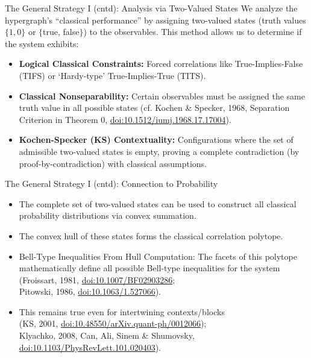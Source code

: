\documentclass{beamer}
\begin{document}
\begin{frame}[shrink]{The General Strategy I (cntd): Analysis via Two-Valued States}
\small
    We analyze the hypergraph's ``classical performance'' by assigning \alert{two-valued states} (truth values $\{1, 0\}$ or $\{$true, false$\}$) to the observables.
%
    This method allows us to determine if the system exhibits:
    \begin{itemize} [<+->] %
        \item \textbf{Logical Classical Constraints:} Forced correlations like True-Implies-False (TIFS) or `Hardy-type' True-Implies-True (TITS).
        \vspace{1em}
        \item \textbf{Classical Nonseparability:} Certain observables must be assigned the same truth value in all possible states (cf. Kochen \& Specker, 1968, Separation Criterion in Theorem 0, \href{https://doi.org/10.1512/iumj.1968.17.17004}{doi:10.1512/iumj.1968.17.17004}).
        \vspace{1em}
        \item \textbf{Kochen-Specker (KS) Contextuality:} Configurations where the set of admissible two-valued states is \alert{empty},
proving a complete contradiction (by proof-by-contradiction) with classical assumptions.
    \end{itemize}
\end{frame}


\begin{frame}{The General Strategy I (cntd): Connection to Probability}
    \begin{itemize}[<+->] %
        \item The complete set of two-valued states can be used to construct all classical probability distributions via \alert{convex summation}.
        \item The convex hull of these states forms the \alert{classical correlation polytope}.
        \item \alert{Bell-Type Inequalities From Hull Computation:} The facets of this polytope mathematically define all
possible  Bell-type inequalities
for the system\\
{\small (Froissart, 1981, \href{https://doi.org/10.1007/BF02903286}{doi:10.1007/BF02903286}; \\
Pitowski, 1986, \href{https://doi.org/10.1063/1.527066}{doi:10.1063/1.527066}).}
\item
This remains true even for \alert{intertwining contexts/blocks}\\
{\small (KS, 2001, \href{https://doi.org/10.48550/arXiv.quant-ph/0012066}{doi:10.48550/arXiv.quant-ph/0012066}); \\
Klyachko, 2008, Can, Ali, Sinem \& Shumovsky, \href{https://doi.org/10.1103/PhysRevLett.101.020403}{doi:10.1103/PhysRevLett.101.020403}). }
    \end{itemize}
\end{frame}
\end{document}
